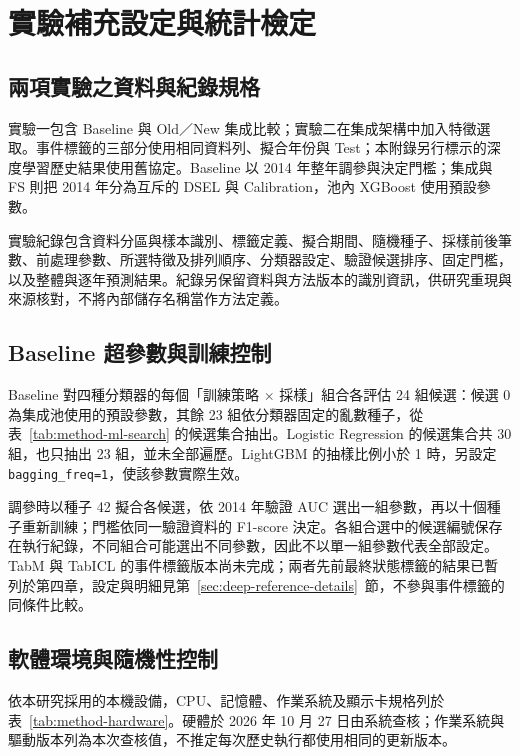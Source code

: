 \chapter{實驗補充設定與統計檢定}\label{app:experimental-details}
\begingroup
\setlength{\emergencystretch}{2em}

\section{兩項實驗之資料與紀錄規格}

實驗一包含 Baseline 與 Old／New 集成比較；實驗二在集成架構中加入特徵選取。事件標籤的三部分使用相同資料列、擬合年份與 Test；本附錄另行標示的深度學習歷史結果使用舊協定。Baseline 以 2014 年整年調參與決定門檻；集成與 FS 則把 2014 年分為互斥的 DSEL 與 Calibration，池內 XGBoost 使用預設參數。

實驗紀錄包含資料分區與樣本識別、標籤定義、擬合期間、隨機種子、採樣前後筆數、前處理參數、所選特徵及排列順序、分類器設定、驗證候選排序、固定門檻，以及整體與逐年預測結果。紀錄另保留資料與方法版本的識別資訊，供研究重現與來源核對，不將內部儲存名稱當作方法定義。

\section{Baseline 超參數與訓練控制}

Baseline 對四種分類器的每個「訓練策略 \ensuremath{\times} 採樣」組合各評估 24 組候選：候選 0 為集成池使用的預設參數，其餘 23 組依分類器固定的亂數種子，從表~\ref{tab:method-ml-search} 的候選集合抽出。Logistic Regression 的候選集合共 30 組，也只抽出 23 組，並未全部遍歷。LightGBM 的抽樣比例小於 1 時，另設定 \nolinkurl{bagging_freq=1}，使該參數實際生效。

調參時以種子 42 擬合各候選，依 2014 年驗證 AUC 選出一組參數，再以十個種子重新訓練；門檻依同一驗證資料的 F1-score 決定。各組合選中的候選編號保存在執行紀錄，不同組合可能選出不同參數，因此不以單一組參數代表全部設定。TabM 與 TabICL 的事件標籤版本尚未完成；兩者先前最終狀態標籤的結果已暫列於第四章，設定與明細見第~\ref{sec:deep-reference-details}~節，不參與事件標籤的同條件比較。

\section{軟體環境與隨機性控制}

依本研究採用的本機設備，CPU、記憶體、作業系統及顯示卡規格列於表~\ref{tab:method-hardware}。硬體於 2026 年 10 月 27 日由系統查核；作業系統與驅動版本列為本次查核值，不推定每次歷史執行都使用相同的更新版本。

